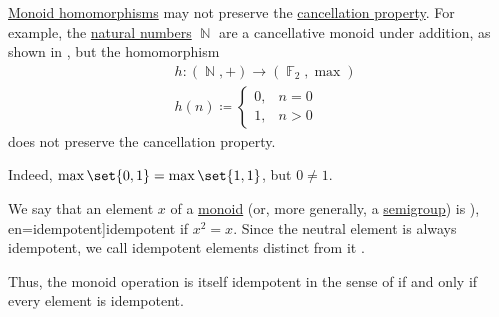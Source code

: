 \begin{example}\label{ex:monoid_cancellation_not_preserved_by_homomorphism}
  \hyperref[def:monoid/homomorphism]{Monoid homomorphisms} may not preserve the \hyperref[def:binary_operation/cancellative]{cancellation property}. For example, the \hyperref[def:natural_numbers]{natural numbers} \( \BbbN \) are a cancellative monoid under addition, as shown in , but the homomorphism
  \begin{equation*}
    \begin{aligned}
      &h: (\BbbN, +) \to (\BbbF_2, \max) \\
      &h(n) \coloneqq \begin{cases}
        0, &n = 0 \\
        1, &n > 0
      \end{cases}
    \end{aligned}
  \end{equation*}
  does not preserve the cancellation property.

  Indeed, \( \max\set{ 0, 1 } = \max\set{ 1, 1 } \), but \( 0 \neq 1 \).
\end{example}

\begin{definition}\label{def:monoid_idempotent}\cite[1]{Golan2010}
  We say that an element \( x \) of a \hyperref[def:monoid]{monoid} (or, more generally, a \hyperref[def:semigroup]{semigroup}) is \term[ru=идемпотент (\cite[72]{Ляпин1960}), en=idempotent]{idempotent} if \( x^2 = x \). Since the neutral element is always idempotent, we call idempotent elements distinct from it .
\end{definition}
\begin{comments}
  \item Thus, the monoid operation is itself idempotent in the sense of  if and only if every element is idempotent.
\end{comments}

